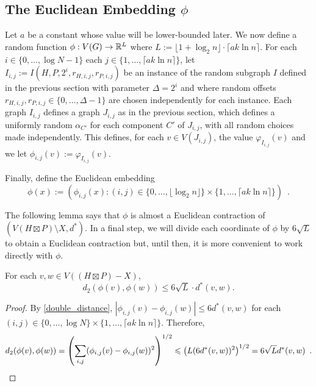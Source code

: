 \documentclass{patmorin}
\renewcommand{\le}{\leqslant}
\newcommand{\pat}[1]{\textcolor{Maroon}{Pat: #1}}
\begin{document}
\subsection{\boldmath The Euclidean Embedding $\phi$}

Let $a$ be a constant whose value will be lower-bounded later.  We now define a random function $\phi:V(G)\to\mathbb{R}^{L}$ where $L:=\lfloor 1+\log_2 n\rfloor\cdot\lceil a k\ln n\rceil$. For each $i\in\{0,\ldots,\log N-1\}$ each $j\in\{1,\ldots,\lceil a k\ln n\rceil\}$, let $I_{i,j}:=I(H,P,2^i,r_{H,i,j},r_{P,i,j})$ be an instance of the random subgraph $I$ defined in the previous section with parameter $\Delta=2^i$ and where random offsets $r_{H,i,j},r_{P,i,j}\in\{0,\ldots,\Delta-1\}$ are chosen independently for each instance.  Each graph $I_{i,j}$ defines a graph $J_{i,j}$ as in the previous section, which defines a uniformly random $\alpha_{C'}$ for each component $C'$ of $J_{i,j}$, with all random choices made independently.  This defines, for each $v\in V(J_{i,j})$, the value $\varphi_{I_{i,j}}(v)$ and we let $\phi_{i,j}(v):= \varphi_{I_{i,j}}(v)$.

Finally, define the Euclidean embedding
\[
   \phi(x) := \left(\phi_{i,j}(x):(i,j)\in \{0,\ldots,\lfloor \log_2 n\rfloor\}\times\{1,\ldots,\lceil a k\ln n\rceil\}\right) \enspace .
\]


The following lemma says that $\phi$ is almost a Euclidean contraction of $(V(H\boxtimes P)\setminus X,d^*)$.  In a final step, we will divide each coordinate of $\phi$ by $6\sqrt{L}$ to obtain a Euclidean contraction but, until then, it is more convenient to work directly with $\phi$.

\begin{lem}\label{euclidean_contraction}
  For each $v,w\in V((H\boxtimes P)-X)$, $$d_2(\phi(v),\phi(w)) \le 6\sqrt{L}\cdot d^*(v,w).$$
\end{lem}

\begin{proof}
  By \cref{double_distance}, $|\phi_{i,j}(v)-\phi_{i,j}(w)|\le 6d^*(v,w)$ for each $(i,j)\in\{0,\ldots,\log N\}\times\{1,\ldots,\lceil ak\ln n\rceil\}$.  Therefore,
  \[
    d_2(\phi(v),\phi(w)) = \left(\sum_{i,j}(\phi_{i,j}(v)-\phi_{i,j}(w))^2\right)^{1/2}
    \le \left(L (6d^*(v,w))^2\right)^{1/2} = 6\sqrt{L}d^*(v,w) \enspace . \qedhere
  \]
\end{proof}


\end{document}
